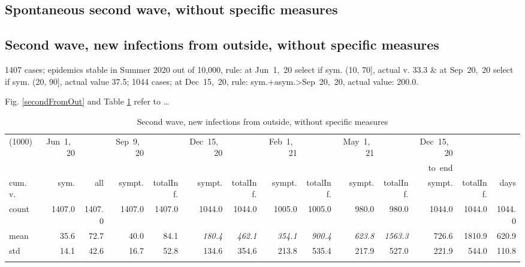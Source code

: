 \documentclass[graybox]{svmult}
\begin{document}
\subsection{Spontaneous second wave, without specific measures}
\label{spont}


\subsection{Second wave, new infections from outside, without specific measures}
\label{secondWithout}

1407 cases; epidemics stable in Summer 2020 out of 10,000, rule: at Jun~1,~20 select if sym. (10, 70], actual v. 33.3 \& at Sep~20,~20 select if sym. (20, 90], actual value 37.5; 1044 cases; at Dec~15,~20, rule: sym.+asym.>Sep~20,~20, actual value: 200.0.

Fig. \ref{secondFromOut} and Table \ref{selForceWave2Tab} refer to \ldots

\begin{table}[t]
\center
\tiny
\begin{tabular}{lrrrrrrrrrrrrr}
\hline\noalign{\smallskip}
(1000) &  Jun~1,~20 & &  Sep~9,~20 & & Dec~15,~20 & & Feb~1,~21 & & May~1,~21 & & Dec~15,~20   \\
& & &  & & & & & & & & to~end \\
cum.~v. &  sym. &  all &  sympt. &  totalInf. &  sympt. &  totalInf. &  sympt. &  totalInf. &  sympt. &  totalInf. &  sympt. &  totalInf.  & days\\
\noalign{\smallskip}\svhline\noalign{\smallskip}
count &   1407.0 &                     1407.0 &   1407.0 &                     1407.0 &   1044.0 &                     1044.0 &   1005.0 &                     1005.0 &    980.0 &                      980.0 &              1044.0 &                  1044.0 & 1044.0 \\
mean  &     35.6 &                       72.7 &     40.0 &                       84.1 &    \emph{180.4} &                      \emph{462.1} &    \emph{354.1} &                      \emph{900.4} &    \emph{623.8} &                     \emph{1563.3} &               726.6 &                  1810.9 &  620.9 \\
std   &     14.1 &                       42.6 &     16.7 &                       52.8 &    134.6 &                      354.6 &    213.8 &                      535.4 &    217.9 &                      527.0 &               221.9 &                   544.0 &  110.8 \\
\hline\noalign{\smallskip}
\end{tabular}
\caption{Second wave, new infections from outside, without specific measures}
\label{selForceWave2Tab}
\end{table}
\end{document}
